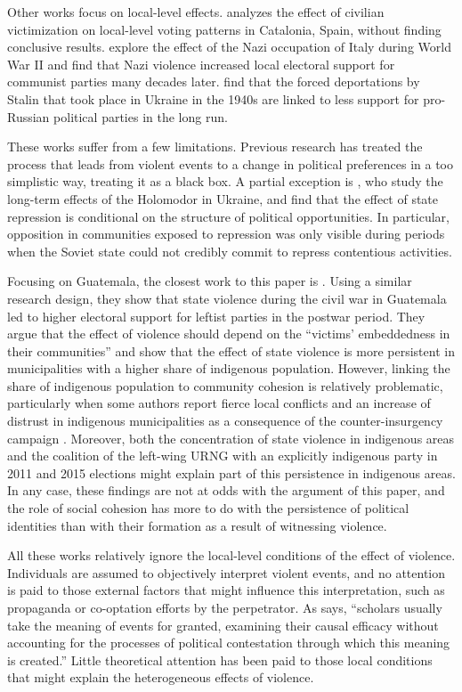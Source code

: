 \documentclass[12pt, notitlepage]{article}
\begin{document}
Other works focus on local-level effects.
\citet{Balcells:2010ab} analyzes the effect of civilian victimization on local-level voting patterns in Catalonia, Spain, without finding conclusive results.
\citet{Fontana:2017aa} explore the effect of the Nazi occupation of Italy during World War II and find that Nazi violence increased local electoral support for communist parties many decades later.
\citet{Rozenas:2017aa} find that the forced deportations by Stalin that took place in Ukraine in the 1940s are linked to less support for pro-Russian political parties in the long run.

These works suffer from a few limitations.
Previous research has treated the process that leads from violent events to a change in political preferences in a too simplistic way, treating it as a black box.
A partial exception is \citet{Rozenas:2019aa}, who study the long-term effects of the Holomodor in Ukraine, and find that the effect of state repression is conditional on the structure of political opportunities.
In particular, opposition in communities exposed to repression was only visible during periods when the Soviet state could not credibly commit to repress contentious activities.

Focusing on Guatemala, the closest work to this paper is \citet{Vogt:2019aa}.
Using a similar research design, they show that state violence during the civil war in Guatemala led to higher electoral support for leftist parties in the postwar period.
They argue that the effect of violence should depend on the ``victims' embeddedness in their communities'' and show that the effect of state violence is more persistent in municipalities with a higher share of indigenous population.
However, linking the share of indigenous population to community cohesion is relatively problematic, particularly when some authors report fierce local conflicts and an increase of distrust in indigenous municipalities as a consequence of the counter-insurgency campaign \citep[e.g.][]{Burrell:2013aa}.
Moreover, both the concentration of state violence in indigenous areas and the coalition of the left-wing URNG with an explicitly indigenous party in 2011 and 2015 elections might explain part of this persistence in indigenous areas.
In any case, these findings are not at odds with the argument of this paper, and the role of social cohesion has more to do with the persistence of political identities than with their formation as a result of witnessing violence.

All these works relatively ignore the local-level conditions of the effect of violence.
Individuals are assumed to objectively interpret violent events, and no attention is paid to those external factors that might influence this interpretation, such as propaganda or co-optation efforts by the perpetrator.
As \citet[1244]{Basta:2018aa} says, ``scholars usually take the meaning of events for granted, examining their causal efficacy without accounting for the processes of political contestation through which this meaning is created.''
Little theoretical attention has been paid to those local conditions that might explain the heterogeneous effects of violence.
\end{document}
